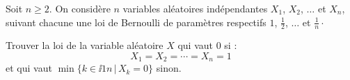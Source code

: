 \documentclass[a4paper,twoside,french,11pt]{VcCours}
\begin{document}
\begin{enumerate}
\begin{enumerate}
\end{enumerate}




%
%
%
%
\end{enumerate}

\begin{Exercice}{} Soit $n \geq 2$. On considère $n$ variables aléatoires indépendantes $X_1$, $X_2$, $\ldots$ et $X_n$, suivant chacune une loi de Bernoulli de paramètres respectifs $1$, $\tfrac{1}{2}$, $\ldots$ et $\tfrac{1}{n}\cdot$

Trouver la loi de la variable aléatoire $X$ qui vaut $0$ si :
$$ X_1= X_2= \cdots = X_n = 1$$
et qui vaut $\min \lbrace k \in \ii{1}{n} \, \vert \, X_k =0 \rbrace$ sinon.
\end{Exercice} 
\end{document}
